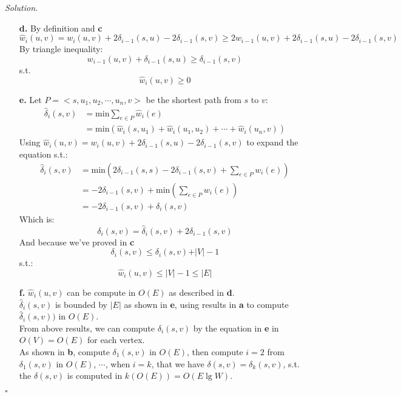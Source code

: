 \documentclass[11pt]{article}
\theoremstyle{definition}
\newenvironment{solution}{\noindent\emph{Solution.}}{\hfill$\square$}
\newcommand\tab[1][1cm]{\hspace*{#1}}
\begin{document}
\begin{solution}
\begin{enumerate}
     \item[\textbf{d.}] \tab By definition  and \textbf{c}
     $$ \widehat{w}_i(u,v) = w_i(u,v) + 2 \delta _{i-1} (s,u) - 2 \delta _{i-1} (s,v) \geq 2 w_{i-1}(u,v) + 2 \delta _{i-1} (s,u) - 2 \delta _{i-1} (s,v)$$
     \tab By triangle inequality:
     $$ w_{i-1}(u,v) +  \delta _{i-1} (s,u) \geq  \delta _{i-1} (s,v)$$
     s.t. $$ \widehat{w}_i(u,v) \geq 0$$
     
     \item[\textbf{e.}] \tab Let $ P = <s, u_1,u_2, \cdots, u_n, v>$ be the shortest path from $s$ to $v$:
     \begin{align*}
     \widehat{\delta}_i(s,v) &= \mbox{min}  \sum_{e \in P} \widehat{w}_i (e)\\
    &= \mbox{min} \left(   \widehat{w}_i (s,u_1) + \widehat{w}_i (u_1,u_2)   + \cdots + \widehat{w}_i (u_n,v)                                   \right) 
     \end{align*} 
    \tab  Using $\widehat{w}_i(u,v) = w_i(u,v) + 2 \delta _{i-1} (s,u) - 2 \delta _{i-1} (s,v)$ to expand the equation s.t.:
     \begin{align*}
     \widehat{\delta}_i(s,v) &= \mbox{min}  \left(    2 \delta_{i-1} (s, s) - 2 \delta_{i-1} (s, v) +       \sum_{e \in P} {w}_i (e)                           \right) \\
     &= - 2 \delta_{i-1} (s, v)  +  \mbox{min}  \left(  \sum_{e \in P} {w}_i (e) \right) \\
     &=   - 2 \delta_{i-1} (s, v)  + \delta_i(s,v)
     \end{align*} 
     \tab Which is:
     $$\delta_i(s,v) =  \widehat{\delta}_i(s,v) + 2 \delta_{i-1} (s, v) $$
     \tab And because we've proved in \textbf{c}
     $$ \delta_i(s,v) \leq  \delta_i(s,v) + \vert V \vert - 1$$
     \tab s.t.:
     $$\widehat{w}_i(u,v)  \leq \vert V \vert - 1 \leq \vert E \vert $$
     
     \item[\textbf{f.}] \tab $\widehat{w}_i(u,v)$ can be compute in $O(E)$ as described in \textbf{d}.\\
     \tab $\widehat{\delta}_i(s,v)$ is bounded by $\vert E \vert$ as shown in \textbf{e}, using results in \textbf{a} to compute $\widehat{\delta}_i(s,v))$ in $O(E)$.\\
     \tab From above results, we can compute $\delta_i(s,v)$ by the equation in \textbf{e} in $O(V) = O(E)$ for each vertex.\\
     \tab As shown in \textbf{b}, compute $\delta_1(s,v)$ in $O(E)$, then compute $i = 2$ from $\delta_1(s,v)$ in $O(E)$, $\cdots$, when $i = k$, that we have ${\delta}(s,v) = {\delta}_k(s,v)$, s.t. the ${\delta}(s,v)$ is computed in $k(O(E)) = O(E \lg W)$.
     

   
 
 
    
\end{enumerate}

\end{solution} 
\end{document}
